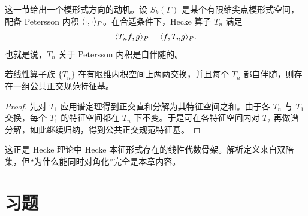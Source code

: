 这一节给出一个模形式方向的动机。设 $S_k(\Gamma)$ 是某个有限维尖点模形式空间，配备 Petersson 内积 $\langle \cdot, \cdot \rangle_P$。在合适条件下，Hecke 算子 $T_n$ 满足
\[
\langle T_nf, g \rangle_P=\langle f, T_ng \rangle_P.
\]
也就是说，$T_n$ 关于 Petersson 内积是自伴随的。

\begin{proposition}
若线性算子族 $\{T_n\}$ 在有限维内积空间上两两交换，并且每个 $T_n$ 都自伴随，则存在一组公共正交规范特征基。
\end{proposition}

\begin{proof}
先对 $T_1$ 应用谱定理得到正交直和分解为其特征空间之和。由于各 $T_n$ 与 $T_1$ 交换，每个 $T_1$ 的特征空间都在 $T_n$ 下不变。于是可在各特征空间内对 $T_2$ 再做谱分解，如此继续归纳，得到公共正交规范特征基。
\end{proof}

\begin{remark}
这正是 Hecke 理论中 Hecke 本征形式存在的线性代数骨架。解析定义来自双陪集，但“为什么能同时对角化”完全是本章内容。
\end{remark}

\section*{习题}

